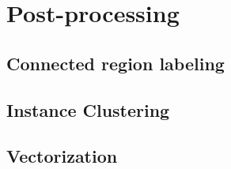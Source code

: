 \chapter{Post-processing}%
\label{chap:post-processing}



\newpage
\section{Connected region labeling}%
\label{sec:connected-region-labeling}


\newpage
\section{Instance Clustering}%
\label{sec:instance-clustering}


\section{Vectorization}%
\label{sec:vectorization}


